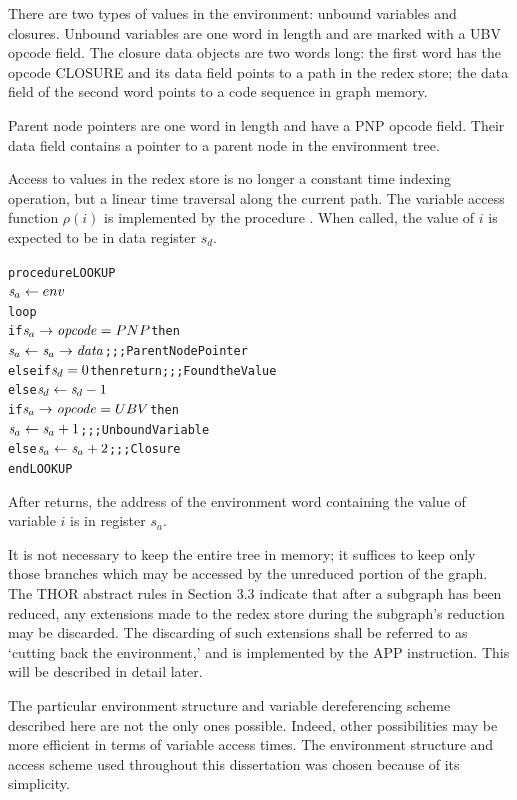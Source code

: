 There are two types of values in the environment: unbound variables and closures. Unbound variables are one word in length and are marked with a UBV opcode field. The closure data objects are two words long: the first word has the opcode CLOSURE and its data field points to a path in the redex store; the data field of the second word points to a code sequence in graph memory.

Parent node pointers are one word in length and have a PNP opcode field. Their data field contains a pointer to a parent node in the environment tree.

Access to values in the redex store is no longer a constant time indexing operation, but a linear time traversal along the current path. The variable access function \(\rho(i)\) is implemented by the procedure . When called, the value of \(i\) is expected to be in data register \(s_d\).

\begin{alltt}
procedure LOOKUP
  \(\rtsa \leftarrow env\)
  loop
    if \(\rtsa\rightarrow\mathit{opcode} = PNP\) then
      \(\rtsa \leftarrow \rtsa\rightarrow\mathit{data}\)    ;;; Parent Node Pointer
    else if \(\rtsd = 0\) then return  ;;; Found the Value
    else \(\rtsd \leftarrow \rtsd-1\)
         if \(\rtsa\rightarrow\mathit{opcode} = UBV\) then
           \(\rtsa \leftarrow \rtsa+1\)         ;;; Unbound Variable
         else \(\rtsa \leftarrow \rtsa+2\)      ;;; Closure
end LOOKUP
\end{alltt}


After  returns, the address of the environment word containing the value of variable \(i\) is in register \(s_a\).

It is not necessary to keep the entire tree in memory; it suffices to keep only those branches which may be accessed by the unreduced portion of the graph. The THOR abstract rules in Section 3.3 indicate that after a subgraph has been reduced, any extensions made to the redex store during the subgraph's reduction may be discarded. The discarding of such extensions shall be referred to as `cutting back the environment,' and is implemented by the APP instruction. This will be described in detail later.

The particular environment structure and variable dereferencing scheme described here are not the only ones possible. Indeed, other possibilities may be more efficient in terms of variable access times. The environment structure and access scheme used throughout this dissertation was chosen because of its simplicity.

